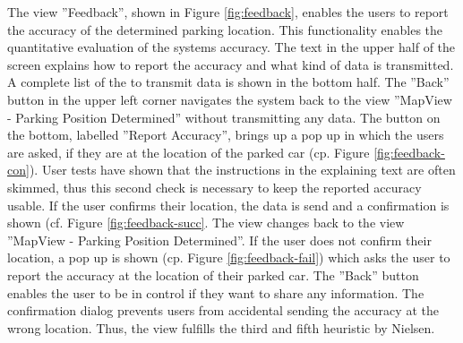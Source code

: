The view ''Feedback'', shown in Figure \ref{fig:feedback}, enables the users to report the accuracy of the determined parking location. This functionality enables the quantitative evaluation of the systems accuracy. The text in the upper half of the screen explains how to report the accuracy and what kind of data is transmitted. A complete list of the to transmit data is shown in the bottom half. The ''Back'' button in the upper left corner navigates the system back to the view ''MapView - Parking Position Determined'' without transmitting any data. The button on the bottom, labelled ''Report Accuracy'', brings up a pop up in which the users are asked, if they are at the location of the parked car (cp. Figure \ref{fig:feedback-con}). User tests have shown that the instructions in the explaining text are often skimmed, thus this second check is necessary to keep the reported accuracy usable. If the user confirms their location, the data is send and a confirmation is shown (cf. Figure \ref{fig:feedback-succ}. The view changes back to the view ''MapView - Parking Position Determined''. If the user does not confirm their location, a pop up is shown (cp. Figure \ref{fig:feedback-fail}) which asks the user to report the accuracy at the location of their parked car. The ''Back'' button enables the user to be in control if they want to share any information. The confirmation dialog prevents users from accidental sending the accuracy at the wrong location. Thus, the view fulfills the third and fifth heuristic by Nielsen. \cite{nielsen1994usability}





